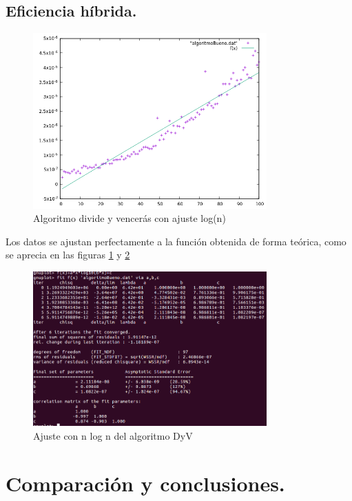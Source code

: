 \documentclass[a4paper, 11pt]{article}
\begin{document}
\subsection{Eficiencia híbrida.}
\begin{figure}[!hbp]
	\includegraphics[width=0.8\textwidth]{algBueno(log).png}
	\caption{ Algoritmo divide y vencerás con ajuste log(n)	\label{Algoritmo divide y vencerás con ajuste log(n)}}
\end{figure}
Los datos se ajustan perfectamente a la función obtenida de forma teórica, como se aprecia en las figuras \ref{Algoritmo divide y vencerás con ajuste log(n)} y \ref{AJuste1}
\begin{figure}[!htp]
	\includegraphics[width=0.8\textwidth]{dyvajuste1.png}
	\caption{Ajuste con n log n del algoritmo DyV	\label{AJuste1}}
\end{figure}



\section{Comparación y conclusiones.}
\end{document}
